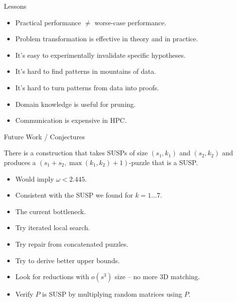 \documentclass[t,10pt,
mathserif,xcolor=dvipsnames]{beamer}
\begin{document}
\begin{myframe}{Lessons}

  \begin{itemize}
  \item Practical performance $\neq$ worse-case performance.
  \item Problem transformation is effective in theory and in practice.
  \item It's easy to experimentally invalidate specific hypotheses.
  \item It's hard to find patterns in mountains of data.  
  \item It's hard to turn patterns from data into proofs.
  \item Domain knowledge is useful for pruning.
  \item Communication is expensive in HPC. 
  \end{itemize}
  
\end{myframe}

\begin{myframe}{Future Work / Conjectures}

  \begin{conj}
    There is a construction that takes SUSPs of size $(s_1,k_1)$ and
    $(s_2,k_2)$ and produces a $(s_1+s_2,\max(k_1,k_2)+1)$-puzzle that
    is a SUSP.
  \end{conj}
  \begin{itemize}
  \item Would imply $\omega < 2.445$.
  \item Consistent with the SUSP we found for $k = 1\ldots 7$.
  \end{itemize}

  \begin{itemize}
  \item The current bottleneck.
  \item Try iterated local search.
  \item Try repair from concatenated puzzles.
  \item Try to derive better upper bounds.
  \end{itemize}


  \begin{itemize}
  \item Look for reductions with $o(s^3)$ size -- no more 3D matching.
  \item Verify $P$ is SUSP by multiplying random matrices using $P$.
  \end{itemize}
  
  
\end{myframe}
\end{document}

